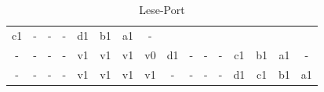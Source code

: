 \begin{table}[H]
{\begin{minipage}{\textwidth}
\begin{tabular}{cccccccccccccccc}
		\multicolumn{1}{|c}{c1} & \multicolumn{1}{c}{-} & \multicolumn{1}{c}{-}& \multicolumn{1}{c}{-} &
		\multicolumn{1}{c}{d1} &
		\multicolumn{1}{c}{b1} &
		\multicolumn{1}{c}{a1}&
		\multicolumn{1}{c}{-} \\
		\multicolumn{1}{c}{-} & \multicolumn{1}{c}{-} & \multicolumn{1}{c}{-} & \multicolumn{1}{c}{-} &
		\multicolumn{1}{c}{v1} & \multicolumn{1}{c}{v1} & \multicolumn{1}{c}{v1} & \multicolumn{1}{c}{v0} &
		\multicolumn{1}{|c}{d1} & \multicolumn{1}{c}{-} & \multicolumn{1}{c}{-}& \multicolumn{1}{c}{-} &
		\multicolumn{1}{c}{c1} &
		\multicolumn{1}{c}{b1} &
		\multicolumn{1}{c}{a1}&
		\multicolumn{1}{c}{-} \\
		\multicolumn{1}{c}{-} & \multicolumn{1}{c}{-} & \multicolumn{1}{c}{-} & \multicolumn{1}{c}{-} &
		\multicolumn{1}{c}{v1} & \multicolumn{1}{c}{v1} & \multicolumn{1}{c}{v1} & \multicolumn{1}{c}{v1} &
		\multicolumn{1}{|c}{-} & \multicolumn{1}{c}{-} & \multicolumn{1}{c}{-}& \multicolumn{1}{c}{-} &
		\multicolumn{1}{c}{d1} &
		\multicolumn{1}{c}{c1} &
		\multicolumn{1}{c}{b1}&
		\multicolumn{1}{c}{a1}		
	\end{tabular}
	\caption{\label{lese-port}Lese-Port}
	\end{minipage}}
	
	
	
\end{table}
